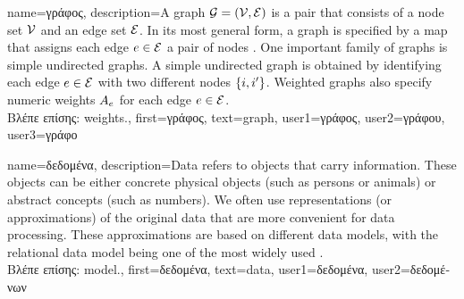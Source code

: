 {name={\foreignlanguage{greek}{γράφος}},
	description={A graph $\mathcal{G} = \left( \mathcal{V},\mathcal{E} \right)$ is a pair that consists of 
		a node set $\mathcal{V}$ and an edge set $\mathcal{E}$. In its most general form, a graph is 
		specified by a map that assigns each edge $e \in \mathcal{E}$ a pair of nodes \cite{RockNetworks}. 
		One important family of graphs is simple undirected graphs. A simple undirected graph 
		is obtained by identifying each edge $e \in \mathcal{E}$ with two different nodes $\{i,i'\}$. 
		Weighted graphs also specify numeric \gls{weights} $A_{e}$ for each 
		edge $e \in \mathcal{E}$.\\
		\foreignlanguage{greek}{Βλέπε επίσης:} \gls{weights}.},
		first={\foreignlanguage{greek}{γράφος}},
		text={graph},
		user1={\foreignlanguage{greek}{γράφος}}, %
  		user2={\foreignlanguage{greek}{γράφου}}, %
		user3={\foreignlanguage{greek}{γράφο}} %
}

{name={\foreignlanguage{greek}{δεδομένα}},
	 description={Data refers to objects that carry information. These 
	 	objects can be either concrete physical objects (such as persons or animals) 
	 	or abstract concepts (such as numbers). We often use representations (or 
	 	approximations) of the original data that are more convenient for data processing. 
	 	These approximations are based on different data \gls{model}s, with the relational data 
	 	\gls{model} being one of the most widely used \cite{codd1970relational}.\\
		\foreignlanguage{greek}{Βλέπε επίσης:} \gls{model}.}, 
	first={\foreignlanguage{greek}{δεδομένα}},
	text={data},
	user1={\foreignlanguage{greek}{δεδομένα}}, %
  	user2={\foreignlanguage{greek}{δεδομένων}} %
}


